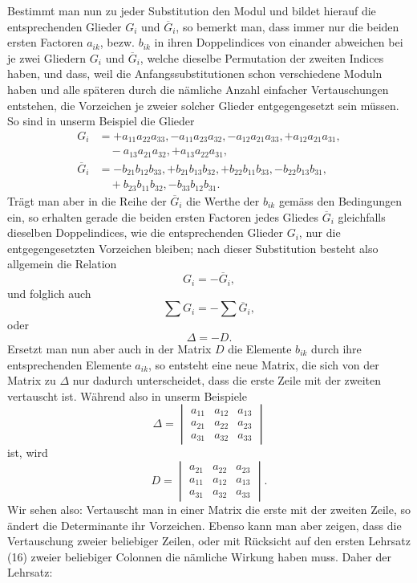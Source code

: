 \documentclass[11pt]{article}
\providecommand{\weberpage}[1]{}
\begin{document}
\weberpage{25}
Bestimmt man nun zu jeder Substitution den Modul und bildet hierauf die entsprechenden Glieder $G_i$ und $\overline{G}_i$, so bemerkt man, dass immer nur die beiden ersten Factoren $a_{ik}$, bezw. $b_{ik}$ in ihren Doppelindices von einander abweichen bei je zwei Gliedern $G_i$ und $\overline{G}_i$, welche dieselbe Permutation der zweiten Indices haben, und dass, weil die Anfangssubstitutionen schon verschiedene Moduln haben und alle sp\"ateren durch die n\"amliche Anzahl einfacher Vertauschungen entstehen, die Vorzeichen je zweier solcher Glieder entgegengesetzt sein m\"ussen. So sind in unserm Beispiel die Glieder
\[
\begin{aligned}
G_i &= + a_{11} a_{22} a_{33}, - a_{11} a_{23} a_{32}, - a_{12} a_{21} a_{33}, + a_{12} a_{21} a_{31}, \\
&\quad - a_{13} a_{21} a_{32}, + a_{13} a_{22} a_{31}, \\
\overline{G}_i &= - b_{21} b_{12} b_{33}, + b_{21} b_{13} b_{32}, + b_{22} b_{11} b_{33}, - b_{22} b_{13} b_{31}, \\
&\quad + b_{23} b_{11} b_{32}, - b_{33} b_{12} b_{31}.
\end{aligned}
\]
Tr\"agt man aber in die Reihe der $\overline{G}_i$ die Werthe der $b_{ik}$ gem\"ass den Bedingungen ein, so erhalten gerade die beiden ersten Factoren jedes Gliedes $\overline{G}_i$ gleichfalls dieselben Doppelindices, wie die entsprechenden Glieder $G_i$, nur die entgegengesetzten Vorzeichen bleiben; nach dieser Substitution besteht also allgemein die Relation
\[
G_i = - \overline{G}_i,
\]
und folglich auch
\[
\sum G_i = - \sum \overline{G}_i,
\]
oder
\[
\varDelta = - D.
\]
Ersetzt man nun aber auch in der Matrix $D$ die Elemente $b_{ik}$ durch ihre entsprechenden Elemente $a_{ik}$, so entsteht eine neue Matrix, die sich von der Matrix zu $\varDelta$ nur dadurch unterscheidet, dass die erste Zeile mit der zweiten vertauscht ist. W\"ahrend also in unserm Beispiele
\[
\varDelta = \begin{vmatrix} a_{11} & a_{12} & a_{13} \\ a_{21} & a_{22} & a_{23} \\ a_{31} & a_{32} & a_{33} \end{vmatrix}
\]
ist, wird
\[
D = \begin{vmatrix} a_{21} & a_{22} & a_{23} \\ a_{11} & a_{12} & a_{13} \\ a_{31} & a_{32} & a_{33} \end{vmatrix}.
\]
Wir sehen also: \glqq Vertauscht man in einer Matrix die erste mit der zweiten Zeile, so \"andert die Determinante ihr Vorzeichen.\grqq{} Ebenso kann man aber zeigen, dass die Vertauschung zweier beliebiger Zeilen, oder mit R\"ucksicht auf den ersten Lehrsatz (16) zweier beliebiger Colonnen die n\"amliche Wirkung haben muss. Daher der Lehrsatz:
\end{document}
